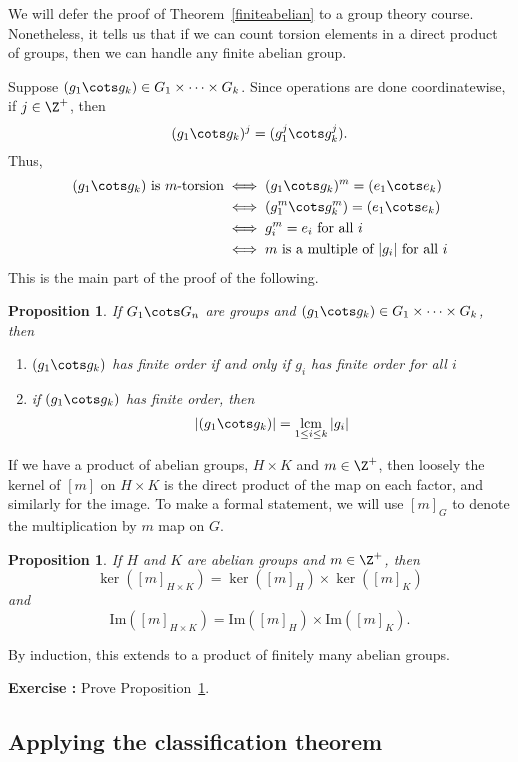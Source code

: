 \documentclass[12pt]{amsart}
\renewcommand{\Im}{\mathrm{Im}} %
\newcounter{probs}
\newenvironment{prob}{%
  \refstepcounter{probs}
  \par\medskip\noindent\textbf{Exercise \theprobs:} }{\par\medskip}
\theoremstyle{plain}
\newtheorem{prop}[thm]{Proposition}
\theoremstyle{definition}
\theoremstyle{remark}
\begin{document}
We will defer the proof of Theorem~\ref{finiteabelian} to a group
theory course.  Nonetheless, it tells us that if we can count torsion
elements in a direct product of groups, then we can handle any finite
abelian group.

Suppose $(g_1\cots g_k)\in G_1\times\cdots \times G_k$.  Since
operations are done coordinatewise, if $j\in\Z^+$, then
\[ (g_1\cots g_k)^j = (g_1^j\cots g_k^j).\]
Thus,
\begin{align*}
(g_1\cots g_k)\text{ is $m$-torsion}
&\iff  (g_1\cots g_k)^m=(e_1\cots  e_k) \\
&\iff  (g_1^m\cots g_k^m)=(e_1\cots  e_k) \\
&\iff g_i^m=e_i \text{ for all $i$} \\
&\iff m \text{ is a multiple of $|g_i|$ for all $i$}
\end{align*}
This is the main part of the proof of the following.
\begin{prop}
If $G_1\cots G_n$ are groups and $(g_1\cots g_k)\in G_1\times\cdots
\times G_k$, then
\begin{enumerate}
\item $(g_1\cots g_k)$ has finite order if and only if $g_i$ has
  finite order for all $i$
\item if $(g_1\cots g_k)$ has finite order, then
\[ |(g_1\cots g_k)| = \operatorname*{lcm}_{1\leq i \leq k} |g_i|\]
\end{enumerate}
\end{prop}

If we have a product of abelian groups, $H\times K$ and $m\in\Z^+$,
then loosely the kernel of $[m]$ on $H\times K$ is the direct product
of the map on each factor, and similarly for the image.  To make a
formal statement, we will use $[m]_G$ to denote the multiplication by
$m$ map on $G$.

\begin{prop}\label{prodker}
  If $H$ and $K$ are abelian groups and $m\in\Z^+$, then
\[ \ker([m]_{H\times K}) = \ker([m]_H)\times \ker([m]_K)\]
and
\[ \Im([m]_{H\times K}) = \Im([m]_H)\times \Im([m]_K).\]
\end{prop}
By induction, this extends to a product of finitely many abelian
groups.
\begin{prob}
  Prove Proposition~\ref{prodker}.
\end{prob}

\subsection{Applying the classification theorem}
\end{document}
